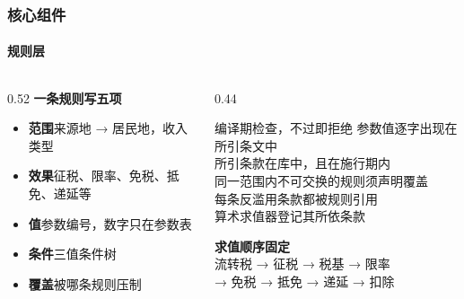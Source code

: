 \documentclass[english, sectionpage=false]{tumbeamer}
\newcommand{\subnote}[1]{{\footnotesize\color{TUMGrayDark} #1}}
\begin{document}
\begin{frame}
  \frametitle{核心组件}
  \framesubtitle{规则层}
  \begin{columns}[T]
    \begin{column}{0.52\textwidth}
      \textcolor{TUMBlue}{\textbf{一条规则写五项}}
      \begin{itemize}
        \item \textbf{范围}\quad 来源地 → 居民地，收入类型
        \item \textbf{效果}\quad 征税、限率、免税、抵免、递延等
        \item \textbf{值}\quad 参数编号，数字只在参数表
        \item \textbf{条件}\quad 三值条件树
        \item \textbf{覆盖}\quad 被哪条规则压制
      \end{itemize}
    \end{column}
    \begin{column}{0.44\textwidth}
      \begin{TUMBox}[TUMOrange]{编译期检查，不过即拒绝}
        参数值逐字出现在所引条文中\\
        所引条款在库中，且在施行期内\\
        同一范围内不可交换的规则须声明覆盖\\
        每条反滥用条款都被规则引用\\
        算术求值器登记其所依条款
      \end{TUMBox}
      \vspace{0.6em}
      \textcolor{TUMBlue}{\textbf{求值顺序固定}}\quad\subnote{阶段内可交换}\\[0.2em]
      {\small 流转税 → 征税 → 税基 → 限率\\ → 免税 → 抵免 → 递延 → 扣除}
    \end{column}
  \end{columns}
\end{frame}
\end{document}
